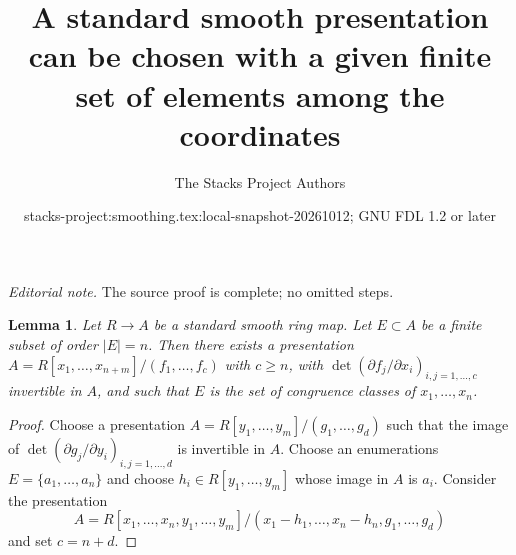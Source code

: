 \documentclass{stacks-project}
\title{A standard smooth presentation can be chosen with a given finite set of elements among the coordinates}
\author{The Stacks Project Authors}
\date{stacks-project:smoothing.tex:local-snapshot-20261012; GNU FDL 1.2 or later}
\theoremstyle{plain}
\newtheorem{lemma}[subsection]{Lemma}
\theoremstyle{definition}
\theoremstyle{remark}
\numberwithin{equation}{subsection}
\begin{document}
\maketitle
\noindent\textit{Editorial note.} The source proof is complete; no omitted steps.\par\medskip
\begin{lemma}
\label{lemma-standard-smooth-include-generators}
Let $R \to A$ be a standard smooth ring map.
Let $E \subset A$ be a finite subset of order $|E| = n$.
Then there exists a presentation
$A = R[x_1, \ldots, x_{n + m}]/(f_1, \ldots, f_c)$ with $c \geq n$,
with $\det(\partial f_j/\partial x_i)_{i, j = 1, \ldots, c}$
invertible in $A$, and such that $E$ is the set of congruence classes of
$x_1, \ldots, x_n$.
\end{lemma}

\begin{proof}
Choose a presentation $A = R[y_1, \ldots, y_m]/(g_1, \ldots, g_d)$
such that the image of
$\det(\partial g_j/\partial y_i)_{i, j = 1, \ldots, d}$
is invertible in $A$. Choose an enumerations $E = \{a_1, \ldots, a_n\}$
and choose $h_i \in R[y_1, \ldots, y_m]$ whose image in $A$ is $a_i$.
Consider the presentation
$$
A = R[x_1, \ldots, x_n, y_1, \ldots, y_m]/
(x_1 - h_1, \ldots, x_n - h_n, g_1, \ldots, g_d)
$$
and set $c = n + d$.
\end{proof}
\end{document}
